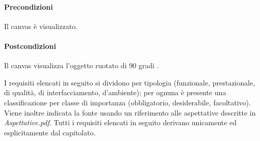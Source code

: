 \paragraph{Precondizioni} Il canvas \`e visualizzato. 
\paragraph{Postcondizioni} Il canvas visualizza l'oggetto ruotato di 90 gradi .

\label{listarequisiti}
I requisiti elencati in seguito si dividono per tipologia (funzionale, prestazionale, di qualit\`a, di interfacciamento, d'ambiente); 
per ognuna \`e presente una classificazione per classe di importanza (obbligatorio, desiderabile, facoltativo). Viene inoltre indicata la fonte usando un riferimento alle aspettative descritte in \textit{Aspettative.pdf}.
Tutti i requisiti elencati in seguito derivano unicamente ed esplicitamente dal capitolato.
